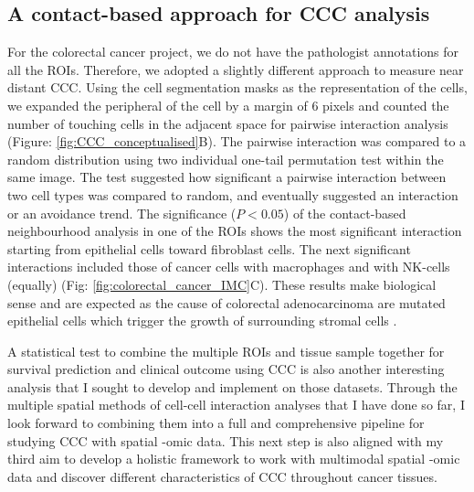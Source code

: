 \subsection{A contact-based approach for CCC analysis}
For the colorectal cancer project, we do not have the pathologist annotations for all the ROIs. Therefore, we adopted a slightly different approach to measure near distant CCC. Using the cell segmentation masks as the representation of the cells, we expanded the peripheral of the cell by a margin of 6 pixels and counted the number of touching cells in the adjacent space for pairwise interaction analysis (Figure: \ref{fig:CCC_conceptualised}B). The pairwise interaction was compared to a random distribution using two individual one-tail permutation test within the same image. The test suggested how significant a pairwise interaction between two cell types was compared to random, and eventually suggested an interaction or an avoidance trend. The significance ($P<0.05$) of the contact-based neighbourhood analysis in one of the ROIs shows the most significant interaction starting from epithelial cells toward fibroblast cells. The next significant interactions included those of cancer cells with macrophages and with NK-cells (equally) (Fig: \ref{fig:colorectal_cancer_IMC}C). These results make biological sense and are expected as the cause of colorectal adenocarcinoma are mutated epithelial cells which trigger the growth of surrounding  stromal cells \cite{bremnes2011role}. 

A statistical test to combine the multiple ROIs and tissue sample together for survival prediction and clinical outcome using CCC is also another interesting analysis that I sought to develop and implement on those datasets. Through the multiple spatial methods of cell-cell interaction analyses that I have done so far, I look forward to combining them into a full and comprehensive pipeline for studying CCC with spatial -omic data. This next step is also aligned with my third aim to develop a holistic framework to work with multimodal spatial -omic data and discover different characteristics of CCC throughout cancer tissues. 

